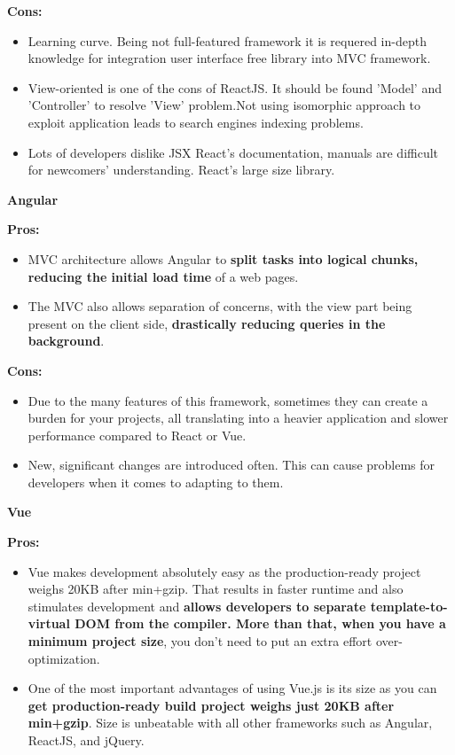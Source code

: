 \begin{enumerate}[label=\Alph*.]
\textbf{Cons:}

\begin{itemize}
  \item Learning curve. Being not full-featured framework it is requered in-depth knowledge for integration user interface free library into MVC framework.
  \item View-oriented is one of the cons of ReactJS. It should be found 'Model' and 'Controller' to resolve 'View' problem.Not using isomorphic approach to exploit application leads to search engines indexing problems.
  \item Lots of developers dislike JSX React's documentation, manuals are difficult for newcomers' understanding. React's large size library.
\end{itemize}

\textbf{Angular}

\textbf{Pros:}

\begin{itemize}
  \item MVC architecture allows Angular to \textbf{split tasks into logical chunks, reducing the initial load time} of a web pages. 
  \item The MVC also allows separation of concerns, with the view part being present on the client side, \textbf{drastically reducing queries in the background}.
\end{itemize}

\textbf{Cons:}

\begin{itemize}
  \item Due to the many features of this framework, sometimes they can create a burden for your projects, all translating into a heavier application and slower performance compared to React or Vue.  
  \item New, significant changes are introduced often. This can cause problems for developers when it comes to adapting to them.
\end{itemize}

\textbf{Vue}

\textbf{Pros:}

\begin{itemize}
  \item Vue makes development absolutely easy as the production-ready project weighs 20KB after min+gzip. That results in faster runtime and also stimulates development and \textbf{allows developers to separate template-to-virtual DOM from the compiler. More than that, when you have a minimum project size}, you don't need to put an extra effort over-optimization.
  \item One of the most important advantages of using Vue.js is its size as you can \textbf{get production-ready build project weighs just 20KB after min+gzip}. Size is unbeatable with all other frameworks such as Angular, ReactJS, and jQuery.
\end{itemize}


\end{enumerate}
